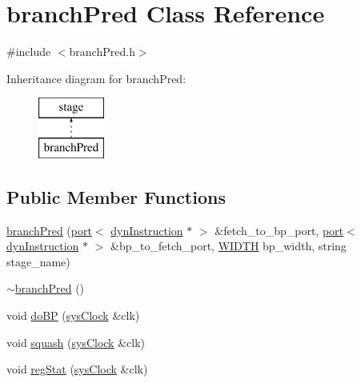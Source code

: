 \hypertarget{classbranchPred}{
\section{branchPred Class Reference}
\label{classbranchPred}
}


{\ttfamily \#include $<$branchPred.h$>$}

Inheritance diagram for branchPred:\begin{figure}[H]
\begin{center}
\leavevmode
\includegraphics[height=2.000000cm]{classbranchPred}
\end{center}
\end{figure}
\subsection*{Public Member Functions}
\begin{DoxyCompactItemize}
\item 
\hyperlink{classbranchPred_ae1c2492d8d28125206920943433f1ae2}{branchPred} (\hyperlink{classport}{port}$<$ \hyperlink{classdynInstruction}{dynInstruction} $\ast$ $>$ \&fetch\_\-to\_\-bp\_\-port, \hyperlink{classport}{port}$<$ \hyperlink{classdynInstruction}{dynInstruction} $\ast$ $>$ \&bp\_\-to\_\-fetch\_\-port, \hyperlink{global_2global_8h_a6fa2e24b8a418fa215e183264cbea3aa}{WIDTH} bp\_\-width, string stage\_\-name)
\item 
\hyperlink{classbranchPred_abe302db16b3d409ae8cab412ddc72feb}{$\sim$branchPred} ()
\item 
void \hyperlink{classbranchPred_a1f0824ac19dd44bb72c2f3d08069f231}{doBP} (\hyperlink{classsysClock}{sysClock} \&clk)
\item 
void \hyperlink{classbranchPred_adf9e3624f322acf4d015628eed0786c2}{squash} (\hyperlink{classsysClock}{sysClock} \&clk)
\item 
void \hyperlink{classbranchPred_a1bb57a2887df1dfcc967fb26c369e8e1}{regStat} (\hyperlink{classsysClock}{sysClock} \&clk)
\end{DoxyCompactItemize}


